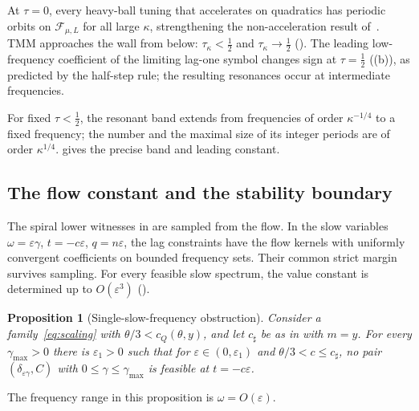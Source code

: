 \documentclass[11pt]{article}
\newtheorem{proposition}[theorem]{Proposition}
\theoremstyle{definition}
\theoremstyle{remark}
\newcommand{\cF}{\mathcal F}
\newcommand{\cQ}{c_{Q}}
\begin{document}
At \(\tau=0\), every heavy-ball tuning that accelerates on quadratics has periodic
orbits on \(\cF_{\mu,L}\) for all large \(\kappa\), strengthening the non-acceleration result
of~\cite{GTD}.  TMM approaches the wall from below:
\(\tau_\kappa<\frac12\) and \(\tau_\kappa\to\frac12\) ().
The leading low-frequency coefficient of the limiting lag-one symbol changes sign at
\(\tau=\frac12\) ((b)), as predicted by the half-step rule;
the resulting resonances occur at intermediate frequencies.


For fixed \(\tau<\tfrac12\), the resonant band extends from frequencies of order
\(\kappa^{-1/4}\) to a fixed frequency; the number and the maximal size of its integer periods are
of order \(\kappa^{1/4}\).   gives the precise band and leading constant.

\subsection{The flow constant and the stability boundary}
\label{sec:exact}



The spiral lower witnesses in  are sampled from the flow.  In the slow variables
\(\omega=\varepsilon\gamma\), \(t=-c\varepsilon\), \(q=n\varepsilon\),
the lag constraints have the flow kernels with uniformly convergent coefficients on bounded frequency sets.
Their common strict margin survives sampling.
For every feasible slow spectrum, the value constant is determined up to \(O(\varepsilon^3)\)
().

\begin{proposition}[Single-slow-frequency obstruction]\label{prop:onedisc}
Consider a family~\eqref{eq:scaling} with \(\theta/3<\cQ(\theta,y)\), and let \(c_\sharp\) be as in  with
\(m=y\).  For every \(\gamma_{\max}>0\) there is \(\varepsilon_1>0\) such that for \(\varepsilon\in(0,\varepsilon_1)\) and
\(\theta/3<c\le c_\sharp\), no pair \((\delta_{\varepsilon\gamma},C)\) with \(0\le\gamma\le\gamma_{\max}\) is feasible at \(t=-c\varepsilon\).
\end{proposition}

The frequency range in this proposition is \(\omega=O(\varepsilon)\).
\end{document}
